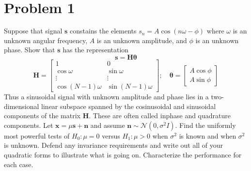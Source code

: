 \documentclass[a4paper]{article}
\begin{document}
\section*{Problem 1}%

Suppose that signal $\bm{s}$ constains the elements $s_n = A\cos (n\omega - \phi)$ where $\omega$ is an unknown angular frequency, $A$ is an unknown amplitude, and $\phi$ is an unknown phase. Show that $\bm{s}$ has the representation
\[
  \bm{s} = \bm{H}\bm{\theta}
\]
\[
  \bm{H} = 
  \begin{bmatrix}
    1 & 0 \\
    \cos \omega & \sin \omega \\
    \vdots & \vdots \\
    \cos (N-1)\omega & \sin(N-1) \omega
  \end{bmatrix}; \quad
  \bm{\theta} = 
  \begin{bmatrix}
    A \cos \phi \\
    A \sin \phi
  \end{bmatrix}
\]
Thus a sinusoidal signal with unknown amplitude and phase lies in a two-dimensional linear subspace spanned by the cosinusoidal and sinusoidal components of the matrix $\bm{H}$. These are often called inphase and quadrature components. Let $\bm{x} = \mu \bm{s} + \bm{n}$ and assume $\bm{n} \sim \mathcal{N}(0, \sigma^2I)$. Find the uniformly most powerful tests of $H_0: \mu = 0$ versus $H_1: \mu > 0$ when $\sigma^2$ is known and when $\sigma^2$ is unknown. Defend any invariance requirements and write out all of your quadratic forms to illustrate what is going on. Characterize the performance for each case.
\end{document}
